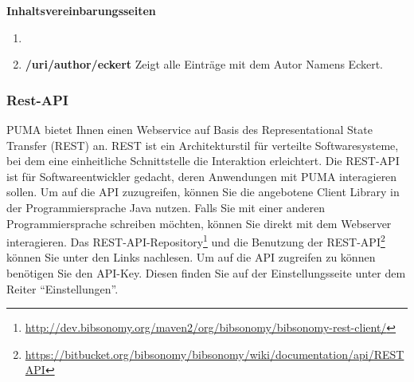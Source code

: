 \documentclass[a4paper,11pt,twoside]{scrbook}
\begin{document}
\textbf{Inhaltsvereinbarungsseiten}
\begin{enumerate}
    \item 
    \item \textbf{/uri/author/eckert} \newline
    Zeigt alle Einträge mit dem Autor Namens Eckert.
\end{enumerate}

\subsubsection{Rest-API}
PUMA bietet Ihnen einen Webservice auf Basis des Representational State Transfer (REST) an. REST ist ein Architekturstil für verteilte Softwaresysteme, bei dem eine einheitliche Schnittstelle die Interaktion erleichtert. \newline
Die REST-API ist für Softwareentwickler gedacht, deren Anwendungen mit PUMA interagieren sollen. Um auf die API zuzugreifen, können Sie die angebotene Client Library in der Programmiersprache Java nutzen. Falls Sie mit einer anderen Programmiersprache schreiben möchten, können Sie direkt mit dem Webserver interagieren.\newline
Das REST-API-Repository\footnote{\url{http://dev.bibsonomy.org/maven2/org/bibsonomy/bibsonomy-rest-client/}} und die Benutzung der REST-API\footnote{\url{https://bitbucket.org/bibsonomy/bibsonomy/wiki/documentation/api/REST API}} können Sie unter den Links nachlesen.
\newline
\newline
Um auf die API zugreifen zu können benötigen Sie den API-Key. Diesen finden Sie auf der Einstellungsseite unter dem Reiter \enquote{Einstellungen}. 
\end{document}
